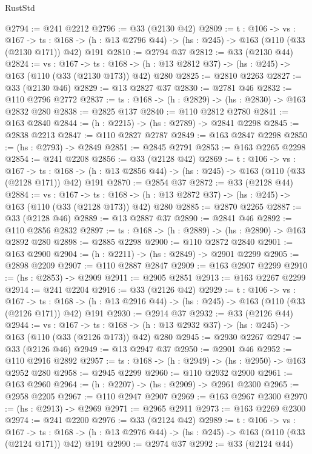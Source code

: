 \begin{lexlean}{RustStd}
\begin{coremodule}
@2794 := @241 @2212
@2796 := @33 (@2130 @42)
@2809 := {t : @106} ->
  {vs : @167} ->
  {ts : @168} -> (h : @13 @2796 @44) -> (hs : @245) -> @163 (@110 (@33 (@2130 @171)) @42) @191
@2810 := @2794 @37
@2812 := @33 (@2130 @44)
@2824 := {vs : @167} ->
  {ts : @168} -> (h : @13 @2812 @37) -> (hs : @245) -> @163 (@110 (@33 (@2130 @173)) @42) @280
@2825 := @2810 @2263
@2827 := @33 (@2130 @46)
@2829 := @13 @2827 @37
@2830 := @2781 @46
@2832 := @110 @2796 @2772
@2837 := {ts : @168} -> (h : @2829) -> (hs : @2830) -> @163 @2832 @280
@2838 := @2825 @137
@2840 := @110 @2812 @2780
@2841 := @163 @2840
@2844 := (h : @2215) -> (hs : @2789) -> @2841 @2298
@2845 := @2838 @2213
@2847 := @110 @2827 @2787
@2849 := @163 @2847 @2298
@2850 := (hs : @2793) -> @2849
@2851 := @2845 @2791
@2853 := @163 @2265 @2298
@2854 := @241 @2208
@2856 := @33 (@2128 @42)
@2869 := {t : @106} ->
  {vs : @167} ->
  {ts : @168} -> (h : @13 @2856 @44) -> (hs : @245) -> @163 (@110 (@33 (@2128 @171)) @42) @191
@2870 := @2854 @37
@2872 := @33 (@2128 @44)
@2884 := {vs : @167} ->
  {ts : @168} -> (h : @13 @2872 @37) -> (hs : @245) -> @163 (@110 (@33 (@2128 @173)) @42) @280
@2885 := @2870 @2265
@2887 := @33 (@2128 @46)
@2889 := @13 @2887 @37
@2890 := @2841 @46
@2892 := @110 @2856 @2832
@2897 := {ts : @168} -> (h : @2889) -> (hs : @2890) -> @163 @2892 @280
@2898 := @2885 @2298
@2900 := @110 @2872 @2840
@2901 := @163 @2900
@2904 := (h : @2211) -> (hs : @2849) -> @2901 @2299
@2905 := @2898 @2209
@2907 := @110 @2887 @2847
@2909 := @163 @2907 @2299
@2910 := (hs : @2853) -> @2909
@2911 := @2905 @2851
@2913 := @163 @2267 @2299
@2914 := @241 @2204
@2916 := @33 (@2126 @42)
@2929 := {t : @106} ->
  {vs : @167} ->
  {ts : @168} -> (h : @13 @2916 @44) -> (hs : @245) -> @163 (@110 (@33 (@2126 @171)) @42) @191
@2930 := @2914 @37
@2932 := @33 (@2126 @44)
@2944 := {vs : @167} ->
  {ts : @168} -> (h : @13 @2932 @37) -> (hs : @245) -> @163 (@110 (@33 (@2126 @173)) @42) @280
@2945 := @2930 @2267
@2947 := @33 (@2126 @46)
@2949 := @13 @2947 @37
@2950 := @2901 @46
@2952 := @110 @2916 @2892
@2957 := {ts : @168} -> (h : @2949) -> (hs : @2950) -> @163 @2952 @280
@2958 := @2945 @2299
@2960 := @110 @2932 @2900
@2961 := @163 @2960
@2964 := (h : @2207) -> (hs : @2909) -> @2961 @2300
@2965 := @2958 @2205
@2967 := @110 @2947 @2907
@2969 := @163 @2967 @2300
@2970 := (hs : @2913) -> @2969
@2971 := @2965 @2911
@2973 := @163 @2269 @2300
@2974 := @241 @2200
@2976 := @33 (@2124 @42)
@2989 := {t : @106} ->
  {vs : @167} ->
  {ts : @168} -> (h : @13 @2976 @44) -> (hs : @245) -> @163 (@110 (@33 (@2124 @171)) @42) @191
@2990 := @2974 @37
@2992 := @33 (@2124 @44)

\end{coremodule}
\end{lexlean}
